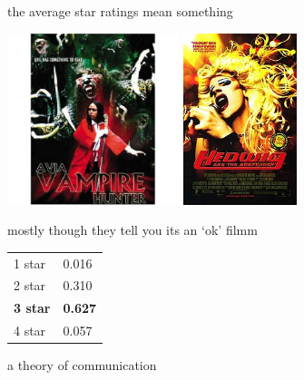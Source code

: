 \documentclass{beamer}
\begin{document}
\begin{frame}{the average star ratings mean something}
  \begin{center}
    \includegraphics[height=5cm]{avia_vampire_hunter.jpg}
    \includegraphics[height=5cm]{hedwig.jpg}
  \end{center}
\end{frame}


\begin{frame}{mostly though they tell you its an `ok' filmm}
  \begin{center}
    \begin{tabular}{l|l}
      \hline
      1 star&0.016\\
      2 star&0.310\\
      \textbf{3 star}&\textbf{0.627}\\
      4 star&0.057\\
      \hline
    \end{tabular}
  \end{center}
\end{frame}

\begin{frame}{a theory of communication}
  \begin{center}
  \end{center}
\end{frame}
\end{document}
